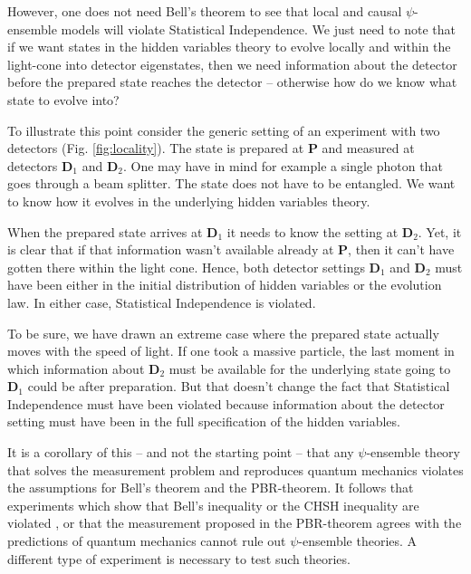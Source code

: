 \documentclass[superscriptaddress,twocolumn,floatfix,nofootinbib]{revtex4-2}
\begin{document}
However, one does not need Bell's theorem to see that local and causal $\psi$-ensemble models will violate Statistical Independence. We just need to note that if we want states in the hidden variables theory to evolve locally and within the light-cone into detector eigenstates, then we need information about the detector before the prepared state reaches the detector -- otherwise how do we know what state to evolve into? 

To illustrate this point consider the generic setting of an experiment with two detectors (Fig. \ref{fig:locality}). The state is prepared at {\bf P} and measured at detectors {\bf D}$_1$ and {\bf D}$_2$. One may have in mind for example a single photon that goes through a beam splitter. The state does not have to be entangled. We want to know how it evolves in the underlying hidden variables theory. 

When the prepared state arrives at {\bf D}$_1$ it needs to know the setting at {\bf D}$_2$. Yet, it is clear that if that information wasn't available already at {\bf P}, then it can't have gotten there within the light cone. Hence, both detector settings {\bf D}$_1$ and {\bf D}$_2$ must have been either in the initial distribution of hidden variables or the evolution law. In either case, Statistical Independence is violated. 

To be sure, we have drawn an extreme case where the prepared state actually moves with the speed of light. If one took a massive particle, the last moment in which information about {\bf D}$_2$ must be available for the underlying state going to {\bf D}$_1$ could be after preparation. But that doesn't change the fact that Statistical Independence must have been violated because information about the detector setting must have been in the full specification of the hidden variables. 

It is a corollary of this -- and not the starting point -- that any $\psi$-ensemble theory that solves the measurement problem and reproduces quantum mechanics violates the assumptions for Bell's theorem and the {\sc PBR}-theorem. It follows that experiments which show that Bell's inequality or the {\sc CHSH} inequality are violated \cite{Aspect1981BellViol}, or that the measurement proposed in the {\sc PBR}-theorem agrees with the predictions of quantum mechanics \cite{Ringbauer2015MeasRealWavefn} cannot rule out $\psi$-ensemble theories. A different type of experiment is necessary to test such theories.  
\end{document}
